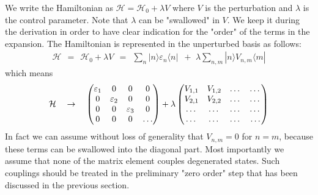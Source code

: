 \documentclass[onecolumn,fleqn]{revtex4}
\newcommand{\amatrix}[1]{\begin{matrix} #1 \end{matrix}}
\newcommand{\beq}{\begin{eqnarray}}
\newcommand{\eeq}{\end{eqnarray}}
\begin{document}
We write the Hamiltonian as ${\mathcal{H}=\mathcal{H}_{0}+ \lambda V}$
where $V$ is the perturbation and ${\lambda}$ is the control parameter.  
Note that $\lambda$ can be "swallowed" in $V$. We keep it during 
the derivation in order to have clear indication for the "order" of the 
terms in the expansion. The Hamiltonian is represented in 
the unperturbed basis as follows: 
\beq
\mathcal{H}
\ \ = \ \ \mathcal{H}_{0}
+ \lambda V 
\ \ = \ \ \sum_{n} | n \rangle \varepsilon_{n} \langle n |
\,\,\, + \,\, 
\lambda \sum_{ n,m} | n \rangle V_{n,m} \langle m | 
\eeq
which means
\beq
\mathcal{H}
\ \ \ \rightarrow \ \ \  
\left(
\amatrix{
\varepsilon_{1} & 0 & 0 & 0 \cr 
0 & \varepsilon_{2} & 0 & 0 \cr 
0 & 0 & \varepsilon_{3} &0 \cr 
0 & 0 & 0 & \dots } 
\right) 
+ 
\lambda
\left(
\amatrix{
V_{1 , 1} & V_{1 , 2} & \dots  & \dots  \cr 
V_{2 , 1} & V_{2 , 2} & \dots  & \dots  \cr 
\dots  & \dots  & \dots  & \dots  \cr 
\dots  & \dots  & \dots  & \dots } 
\right) 
\eeq
In fact we can assume without loss of generality  
that ${V_{n,m} = 0}$ for ${n=m}$, because 
these terms can be swallowed into the diagonal part. 
Most importantly we assume that none of the 
matrix element couples degenerated states. 
Such couplings should be treated in the preliminary 
"zero order" step that has been discussed 
in the previous section. 
  
\end{document}
